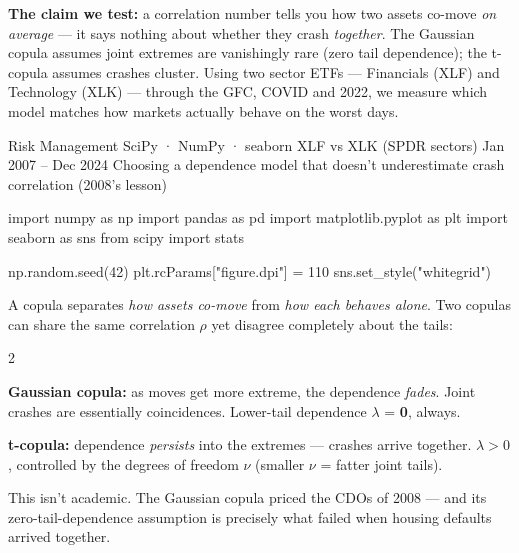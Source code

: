 \documentclass{pyportfolios-note}
\begin{document}
\thispagestyle{notecover}




\textbf{The claim we test:} a correlation number tells you how two assets
co-move \textit{on average} — it says nothing about whether they crash
\textit{together}. The Gaussian copula assumes joint extremes are vanishingly
rare (zero tail dependence); the t-copula assumes crashes cluster. Using two
sector ETFs — Financials (XLF) and Technology (XLK) — through the GFC, COVID
and 2022, we measure which model matches how markets actually behave on the
worst days.

\notecard
  {Risk Management}
  {SciPy · NumPy · seaborn}
  {XLF vs XLK (SPDR sectors)}
  {Jan 2007 – Dec 2024}
  {Choosing a dependence model that doesn't underestimate crash correlation
   (2008's lesson)}

\begin{notecode}
import numpy as np
import pandas as pd
import matplotlib.pyplot as plt
import seaborn as sns
from scipy import stats

np.random.seed(42)
plt.rcParams["figure.dpi"] = 110
sns.set_style("whitegrid")
\end{notecode}

\noteneedroom{160bp}

A copula separates \textit{how assets co-move} from \textit{how each behaves
alone}. Two copulas can share the same correlation $\rho$ yet disagree
completely about the tails:

\begin{multicols}{2}
\begin{notebullets}
\item \textbf{Gaussian copula:} as moves get more extreme, the dependence
      \textit{fades}. Joint crashes are essentially coincidences. Lower-tail
      dependence $\lambda$ = \textbf{0}, always.
\item \textbf{t-copula:} dependence \textit{persists} into the extremes —
      crashes arrive together. $\lambda > 0$, controlled by the degrees of
      freedom $\nu$ (smaller $\nu$ = fatter joint tails).
\end{notebullets}

This isn't academic. The Gaussian copula priced the CDOs of 2008 — and its
zero-tail-dependence assumption is precisely what failed when housing defaults
arrived together.
\end{multicols}
\end{document}
